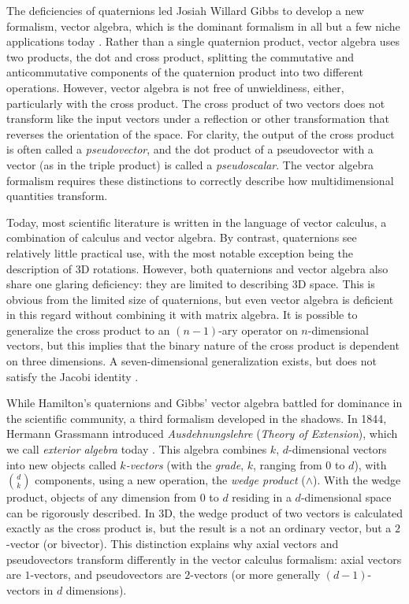 \documentclass{juliacon}
\begin{document}
The deficiencies of quaternions led Josiah Willard Gibbs to develop a new formalism, vector algebra, which is the dominant formalism in all but a few niche applications today \cite{multiple-algebra}.
Rather than a single quaternion product, vector algebra uses two products, the dot and cross product, splitting the commutative and anticommutative components of the quaternion product into two different operations.
However, vector algebra is not free of unwieldiness, either, particularly with the cross product.
The cross product of two vectors does not transform like the input vectors under a reflection or other transformation that reverses the orientation of the space. For clarity, the output of the cross product is often called a \textit{pseudovector}, and the dot product of a pseudovector with a vector (as in the triple product) is called a \textit{pseudoscalar}. The vector algebra formalism requires these distinctions to correctly describe how multidimensional quantities transform.

Today, most scientific literature is written in the language of vector calculus, a combination of calculus and vector algebra. By contrast, quaternions see relatively little practical use, with the most notable exception being the description of 3D rotations. However, both quaternions and vector algebra also share one glaring deficiency: they are limited to describing 3D space. This is obvious from the limited size of quaternions, but even vector algebra is deficient in this regard without combining it with matrix algebra. It is possible to generalize the cross product to an $(n-1)$-ary operator on $n$-dimensional vectors, but this implies that the binary nature of the cross product is dependent on three dimensions. A seven-dimensional generalization exists, but does not satisfy the Jacobi identity \cite{lounesto2001clifford}.

While Hamilton's quaternions and Gibbs' vector algebra battled for dominance in the scientific community, a third formalism developed in the shadows. In 1844, Hermann Grassmann introduced \textit{Ausdehnungslehre} (\textit{Theory of Extension}), which we call \textit{exterior algebra} today \cite{Ausdehnungslehre}. This algebra combines $k$, $d$-dimensional vectors into new objects called \textit{$k$-vectors} (with the \textit{grade}, $k$, ranging from 0 to $d$), with $\binom{d}{k}$ components, using a new operation, the \textit{wedge product} ($\wedge$). With the wedge product, objects of any dimension from 0 to $d$ residing in a $d$-dimensional space can be rigorously described.
In 3D, the wedge product of two vectors is calculated exactly as the cross product is, but the result is a not an ordinary vector, but a $2$-vector (or bivector). This distinction explains why axial vectors and pseudovectors transform differently in the vector calculus formalism: axial vectors are $1$-vectors, and pseudovectors are $2$-vectors (or more generally $\left(d-1\right)$-vectors in $d$ dimensions).
\end{document}
